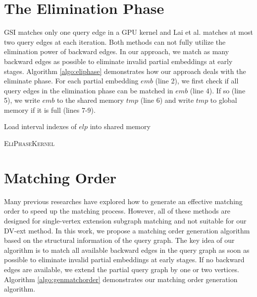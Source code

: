 \section{The Elimination Phase\label{sec:eliphase}}  GSI \cite{zeng2020gsi} matches only one query edge in a GPU kernel and Lai et al.
\cite{lai2015scalable} matches at most two query edges at each iteration. Both methods can not fully utilize the elimination power of
backward edges. In our approach, we match as many backward edges as possible to eliminate invalid partial embeddings at early stages.
Algorithm \ref{algo:eliphase} demonstrates how our approach deals with the eliminate phase. For each partial embedding $emb$ (line 2), we
first check if all query edges in the elimination phase can be matched in $emb$ (line 4). If so (line 5), we write $emb$ to the shared
memory $tmp$ (line 6) and write $tmp$ to global memory if it is full (lines 7-9).
\begin{algorithm}
Load interval indexes of $elp$ into shared memory\;
\caption{\textsc{EliPhaseKernel}}
\label{algo:eliphase}
\end{algorithm}



\section{Matching Order\label{sec:matchingorder}} Many previous researches \cite{bi2016efficient,sun2020subgraph,sun2020rapidmatch,guo2020gpu} have explored how to
generate an effective matching order to speed up the matching process. However, all of these methods are designed for single-vertex
extension subgraph matching and not suitable for our DV-ext method. In this work, we propose a matching order generation algorithm based on
the structural information of the query graph. The key idea of our algorithm is to match all available backward edges in the query graph as
soon as possible to eliminate invalid partial embeddings at early stages. If no backward edges are available, we extend the partial query
graph by one or two vertices. Algorithm \ref{algo:genmatchorder} demonstrates our matching order generation algorithm.

